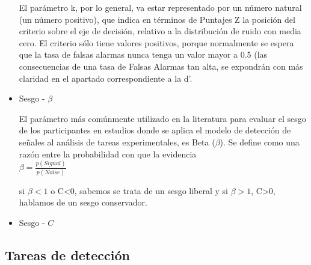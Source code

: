 \begin{itemize}
 El parámetro k, por lo general, va estar representado por un número natural (un número positivo), que indica en términos de Puntajes Z  la posición del criterio sobre el eje de decisión, relativo a la distribución de ruido con media cero. El criterio sólo tiene valores positivos, porque normalmente se espera que la tasa de falsas alarmas nunca tenga un valor mayor a 0.5 (las consecuencias de una tasa de Falsas Alarmas tan alta, se expondrán con más claridad en el apartado correspondiente a la d’. \\


\item Sesgo - $\beta$

El parámetro más comúnmente utilizado en la literatura para evaluar el sesgo de los participantes en estudios donde se aplica el modelo de detección de señales al análisis de tareas experimentales, es Beta ($\beta$). Se define como una razón entre la probabilidad con que la evidencia  \\

$\beta = \frac{p(Signal)}{p(Noise)}$

si $\beta<1$ o C<0, sabemos se trata de un sesgo liberal y si $\beta>1$, C>0, hablamos de un sesgo conservador.\\

\item Sesgo - $C$


\end{itemize}   %




\subsection{Tareas de detección}

